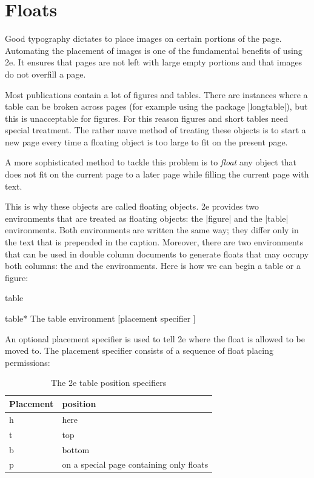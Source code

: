 
\chapter{Floats}

Good typography dictates to place images on certain portions of the page. Automating the placement of images is one of the fundamental benefits of using \latex2e. It ensures that pages are not left with large empty portions and that images do not overfill a page.

Most publications contain a lot of figures and tables. There are instances where
a table can be broken across pages (for example using the package |longtable|), but this is unacceptable for figures. For this reason
figures and short tables need special treatment. The rather naıve method of treating these
objects is to start a new page every time a floating object is too large to fit on the present
page. 

A more sophisticated method to tackle this problem is to \emph{float} any object that
does not fit on the current page to a later page while filling the current page with text.

This is why these objects are called floating objects. \latex2e provides two environments
that are treated as floating objects: the |figure| and the |table| environments. Both environments
are written the same way; they differ only in the text that is prepended in the
caption. Moreover, there are two environments that can be used in double column documents
to generate floats that may occupy both columns: the  and the 
environments. Here is how we can begin a table or a figure:

\begin{environment}{table}
\begin{environment}{table*}
 The table environment 
[placement specifier ]
\end{environment}
\end{environment}

An optional placement specifier is used to tell \latex2e where the float is allowed to be
moved to. The placement specifier consists of a sequence of float placing permissions:

\begin{table}[htbp]
\centering
\begin{tabular}{lp{3.5cm}}
\toprule
Placement   & position\\
\midrule
h                 & here\\
t                  & top\\
b                 & bottom\\
p                 & on a special page containing only floats\\
\bottomrule
\end{tabular}

\caption{The \latex2e table position specifiers}
\end{table}




